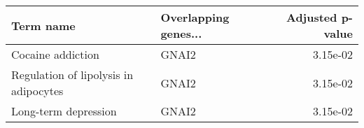 \begin{tabular}{llr}
\toprule
                            Term name & Overlapping genes... &  Adjusted p-value \\
\midrule
                    Cocaine addiction &                GNAI2 &          3.15e-02 \\
Regulation of lipolysis in adipocytes &                GNAI2 &          3.15e-02 \\
                 Long-term depression &                GNAI2 &          3.15e-02 \\
\bottomrule
\end{tabular}
